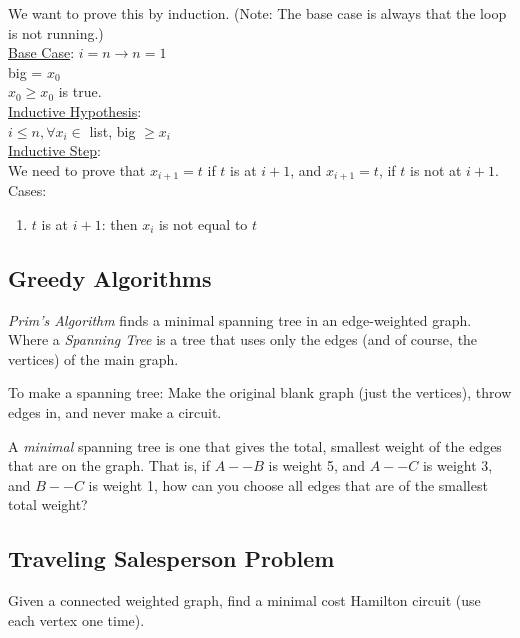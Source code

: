 \documentclass{article}
\begin{document}
    We want to prove this by induction. (Note: The base case is always that the loop is not running.) \\

    \underline{Base Case}: $i=n \rightarrow n=1$\\
    big = $x_0$ \\
    $x_0 \geq x_0$ is true. \\

    \underline{Inductive Hypothesis}: \\
    $i \leq n, \forall x_i \in$ list, big $\geq x_i$ \\

    \underline{Inductive Step}: \\
    We need to prove that $x_{i + 1} = t$ if $t$ is at $i + 1$, and $x_{i + 1} = t$, if $t$ is not at $i + 1$. \\
    Cases: \begin{enumerate}
        \item $t$ is at $i + 1$: then $x_i$ is not equal to $t$
    \end{enumerate}


    \subsection{Greedy Algorithms}

    \begin{definition}
        \textit{Prim's Algorithm} finds a minimal spanning tree in an edge-weighted graph. Where a \textit{Spanning Tree} is a tree that uses only the edges (and of course, the vertices) of the main graph.
    \end{definition}
    \noindent To make a spanning tree: Make the original blank graph (just the vertices), throw edges in, and never make a circuit. 

    \noindent A \textit{minimal} spanning tree is one that gives the total, smallest weight of the edges that are on the graph. That is, if $A--B$ is weight 5, and $A--C$ is weight 3, and $B--C$ is weight 1, how can you choose all edges that are of the smallest total weight? 

    \subsection{Traveling Salesperson Problem}
    Given a connected weighted graph, find a minimal cost Hamilton circuit (use each vertex one time).
\end{document}
